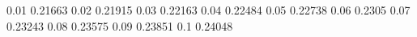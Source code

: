 0.01 0.21663
0.02 0.21915
0.03 0.22163
0.04 0.22484
0.05 0.22738
0.06 0.2305
0.07 0.23243
0.08 0.23575
0.09 0.23851
0.1	 0.24048
